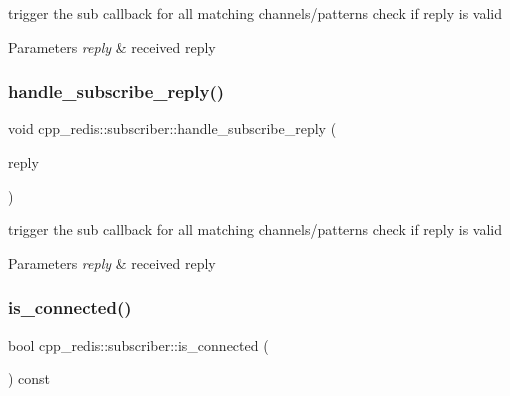 trigger the sub callback for all matching channels/patterns check if reply is valid


\begin{DoxyParams}{Parameters}
{\em reply} & received reply \\
\hline
\end{DoxyParams}
\mbox{\label{classcpp__redis_1_1subscriber_a9b8e9e1dc12493703c02f2c832bd20d9}} 
\subsubsection{\texorpdfstring{handle\+\_\+subscribe\+\_\+reply()}{handle\_subscribe\_reply()}}
{\footnotesize\ttfamily void cpp\+\_\+redis\+::subscriber\+::handle\+\_\+subscribe\+\_\+reply (\begin{DoxyParamCaption}\item[{const std\+::vector$<$ \hyperlink{classcpp__redis_1_1reply}{reply} $>$ \&}]{reply }\end{DoxyParamCaption})\hspace{0.3cm}{\ttfamily [private]}}

trigger the sub callback for all matching channels/patterns check if reply is valid


\begin{DoxyParams}{Parameters}
{\em reply} & received reply \\
\hline
\end{DoxyParams}
\mbox{\label{classcpp__redis_1_1subscriber_a13ff83c3944b33851dfcf364f53b146c}} 
\subsubsection{\texorpdfstring{is\+\_\+connected()}{is\_connected()}}
{\footnotesize\ttfamily bool cpp\+\_\+redis\+::subscriber\+::is\+\_\+connected (\begin{DoxyParamCaption}\item[{void}]{ }\end{DoxyParamCaption}) const}

